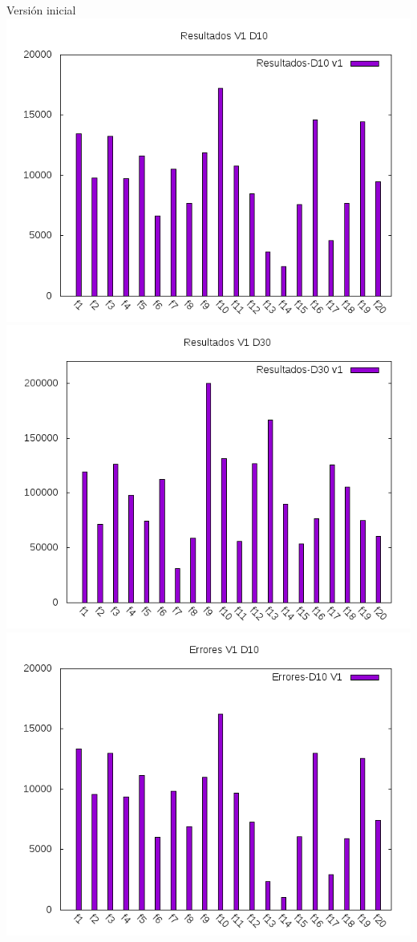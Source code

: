 \documentclass[10pt]{beamer}
\begin{document}
	\begin{frame}[fragile]{Versión inicial}
		\centering
		\includegraphics[scale=0.25]{./Imagenes/Resultados/resultados_v1_d10.png}
		\includegraphics[scale=0.25]{./Imagenes/Resultados/resultados_v1_d30.png}
		\includegraphics[scale=0.25]{./Imagenes/Errores/errores_v1_d10.png}

\end{frame}
\end{document}
